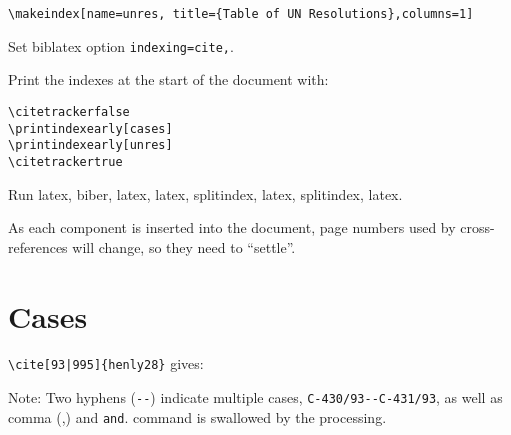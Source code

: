 \begin{verbatim}
\makeindex[name=unres, title={Table of UN Resolutions},columns=1]
\end{verbatim}

Set biblatex option \verb|indexing=cite,|.

Print the indexes at the start of the document with:

\begin{verbatim}
\citetrackerfalse
\printindexearly[cases]
\printindexearly[unres]
\citetrackertrue
\end{verbatim}

Run latex, biber, latex, latex, splitindex, latex, splitindex, latex.

As each component is inserted into the document, page numbers used by cross-references will change, so they need to ``settle''.


\section{Cases}







\verb>\cite[93|995]{henly28}> gives: \cite[93|995]{henly28}








Note: Two hyphens (\verb|--|) indicate multiple cases, \verb|C-430/93--C-431/93|, as well as comma (,) and \verb|and|.  command is swallowed by the processing.

